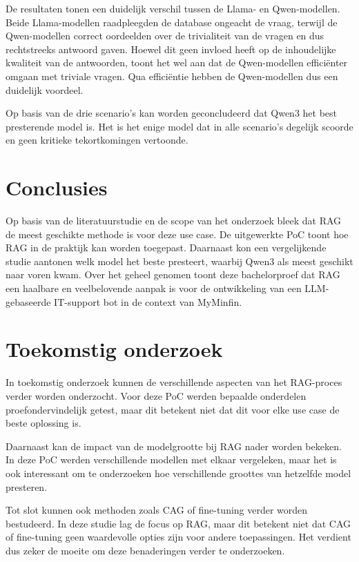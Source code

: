 \documentclass[a0,portrait]{hogent-poster}
\begin{document}
\begin{multicols}{2}
De resultaten tonen een duidelijk verschil tussen de Llama- en Qwen-modellen. Beide Llama-modellen raadpleegden de database ongeacht de vraag, terwijl de Qwen-modellen correct oordeelden over de trivialiteit van de vragen en dus rechtstreeks antwoord gaven. Hoewel dit geen invloed heeft op de inhoudelijke kwaliteit van de antwoorden, toont het wel aan dat de Qwen-modellen efficiënter omgaan met triviale vragen. Qua efficiëntie hebben de Qwen-modellen dus een duidelijk voordeel.

Op basis van de drie scenario’s kan worden geconcludeerd dat Qwen3 het best presterende model is. Het is het enige model dat in alle scenario’s degelijk scoorde en geen kritieke tekortkomingen vertoonde.


\section{Conclusies}

Op basis van de literatuurstudie en de scope van het onderzoek bleek dat RAG de meest geschikte methode is voor deze use case. De uitgewerkte PoC toont hoe RAG in de praktijk kan worden toegepast. Daarnaast kon een vergelijkende studie aantonen welk model het beste presteert, waarbij Qwen3 als meest geschikt naar voren kwam. Over het geheel genomen toont deze bachelorproef dat RAG een haalbare en veelbelovende aanpak is voor de ontwikkeling van een LLM-gebaseerde IT-support bot in de context van MyMinfin.


\section{Toekomstig onderzoek}
In toekomstig onderzoek kunnen de verschillende aspecten van het RAG-proces verder worden onderzocht. Voor deze PoC werden bepaalde onderdelen proefondervindelijk getest, maar dit betekent niet dat dit voor elke use case de beste oplossing is.

Daarnaast kan de impact van de modelgrootte bij RAG nader worden bekeken. In deze PoC werden verschillende modellen met elkaar vergeleken, maar het is ook interessant om te onderzoeken hoe verschillende groottes van hetzelfde model presteren.

Tot slot kunnen ook methoden zoals CAG of fine-tuning verder worden bestudeerd. In deze studie lag de focus op RAG, maar dit betekent niet dat CAG of fine-tuning geen waardevolle opties zijn voor andere toepassingen. Het verdient dus zeker de moeite om deze benaderingen verder te onderzoeken.

\end{multicols}
\end{document}
